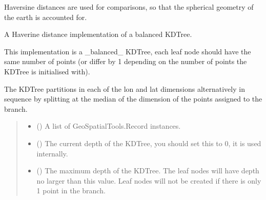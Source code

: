 \documentclass[letterpaper,10pt,english]{sphinxmanual}
\begin{document}
\sphinxAtStartPar
Haversine distances are used for comparisons, so that the spherical geometry
of the earth is accounted for.

\begin{fulllineitems}
\label{\detokenize{kdtree:geotrees.kdtree.KDTree}}
\pysigstartsignatures
\pysiglinewithargsret
{}
{\sphinxparamcomma {}\sphinxparamcomma {}}
{}
\pysigstopsignatures
\sphinxAtStartPar
A Haverine distance implementation of a balanced KDTree.

\sphinxAtStartPar
This implementation is a \_balanced\_ KDTree, each leaf node should have the
same number of points (or differ by 1 depending on the number of points
the KDTree is initialised with).

\sphinxAtStartPar
The KDTree partitions in each of the lon and lat dimensions alternatively
in sequence by splitting at the median of the dimension of the points
assigned to the branch.
\begin{quote}\begin{description}
\begin{itemize}
\item {}
\sphinxAtStartPar
{} (\sphinxstyleliteralemphasis{\sphinxupquote{{[}}}{\hyperref[\detokenize{record:geotrees.record.Record}]{\sphinxcrossref{\sphinxstyleliteralemphasis{\sphinxupquote{Record}}}}}\sphinxstyleliteralemphasis{\sphinxupquote{{]}}}) \textendash{} A list of GeoSpatialTools.Record instances.

\item {}
\sphinxAtStartPar
{} () \textendash{} The current depth of the KDTree, you should set this to 0, it is used
internally.

\item {}
\sphinxAtStartPar
{} () \textendash{} The maximum depth of the KDTree. The leaf nodes will have depth no
larger than this value. Leaf nodes will not be created if there is
only 1 point in the branch.


\end{itemize}
\end{description}
\end{quote}
\end{fulllineitems}
\end{document}
